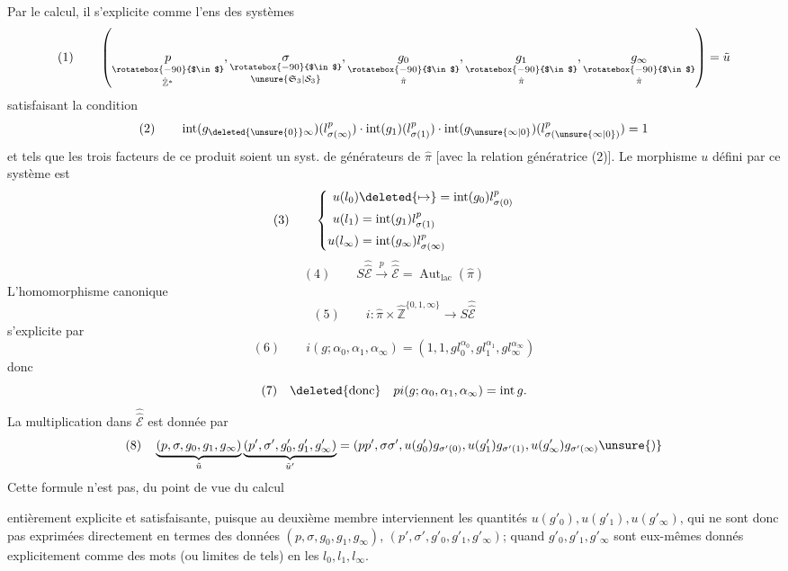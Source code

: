 Par le calcul, il s'explicite comme l'ens des systèmes
\[
(1)\qquad\left(\underset{\hat{\mathbb Z}^{*}}{\underset{\rotatebox{-90}{$\in$}}{p}},\underset{\unsure{\mathfrak S_3|\mathcal S_3}}{\underset{\rotatebox{-90}{$\in$}}{\sigma}},\underset{\hat\pi}{\underset{\rotatebox{-90}{$\in$}}{g_0}},\underset{\hat\pi}{\underset{\rotatebox{-90}{$\in$}}{g_1}},\underset{\hat\pi}{\underset{\rotatebox{-90}{$\in$}}{g_\infty}}\right)=\tilde u
\]
satisfaisant la condition
\[
(2)\qquad\operatorname{int}(g_{\deleted{\unsure{0}}\infty})(l_{\sigma(\infty)}^p)\cdot\operatorname{int}(g_1)(l_{\sigma(1)}^p)\cdot\operatorname{int}(g_{\unsure{\infty|0}})(l_{\sigma(\unsure{\infty|0})}^p)=1
\]
et tels que les trois facteurs de ce produit soient un syst. de générateurs de $\hat\pi$ [avec la relation génératrice (2)]. Le morphisme $u$ défini par ce  système est
\[
(3)\qquad\left\{\begin{aligned}
u(l_0)&\deleted{\mapsto}=\operatorname{int}(g_0)l_{\sigma(0)}^p\\
u(l_1)&=\operatorname{int}(g_1)l_{\sigma(1)}^p\\
u(l_\infty)&=\operatorname{int}(g_\infty)l_{\sigma(\infty)}^p
\end{aligned}\right.
\]
\[
(4)\qquad S\widehat{\widehat{\mathcal E}}\xrightarrow{p}\widehat{\widehat{\mathcal E}}=\operatorname{Aut}_{\mathrm{lac}}(\hat\pi)
\]
L'homomorphisme canonique
\[
(5)\qquad i:\hat\pi\times\hat{\mathbb Z}^{\{0,1,\infty\}}\longrightarrow S\widehat{\widehat{\mathcal E}}
\]
s'explicite par
\[
(6)\qquad i(g;\alpha_0,\alpha_1,\alpha_\infty)=(1,1,gl_0^{\alpha_0},gl_1^{\alpha_1},gl_\infty^{\alpha_\infty})
\]
donc
\[
(7)\quad\deleted{\text{donc}}\quad pi(g;\alpha_0,\alpha_1,\alpha_\infty)=\operatorname{int}g.
\]
La multiplication dans $\widehat{\widehat{\mathcal E}}$ est donnée par
\[
(8)\quad\underbrace{(p,\sigma,g_0,g_1,g_\infty)}_{\tilde u}\underbrace{(p',\sigma',g'_0,g'_1,g'_\infty)}_{\tilde u'}=(pp',\sigma\sigma',u(g'_0)g_{\sigma'(0)},u(g'_1)g_{\sigma'(1)},u(g'_\infty)g_{\sigma'(\infty)}\unsure{)}
\]
Cette formule n'est pas, du point de vue du calcul\unsure{,}

entièrement explicite et satisfaisante, puisque au deuxième membre interviennent les quantités $u(g'_0),u(g'_1),u(g'_\infty)$, qui ne sont donc pas exprimées directement en termes des  données $(p,\sigma,g_0,g_1,g_\infty)$, $(p',\sigma',g'_0,g'_1,g'_\infty)$;  quand $g'_0,g'_1,g'_\infty$ sont eux-mêmes donnés explicitement comme des mots (ou limites de tels) en les $l_0,l_1,l_\infty$.

